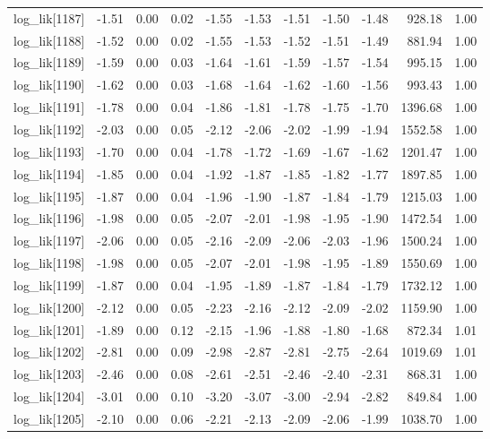 \begin{table}[ht]
\begin{tabular}{rrrrrrrrrrr}
  log\_lik[1187] & -1.51 & 0.00 & 0.02 & -1.55 & -1.53 & -1.51 & -1.50 & -1.48 & 928.18 & 1.00 \\ 
  log\_lik[1188] & -1.52 & 0.00 & 0.02 & -1.55 & -1.53 & -1.52 & -1.51 & -1.49 & 881.94 & 1.00 \\ 
  log\_lik[1189] & -1.59 & 0.00 & 0.03 & -1.64 & -1.61 & -1.59 & -1.57 & -1.54 & 995.15 & 1.00 \\ 
  log\_lik[1190] & -1.62 & 0.00 & 0.03 & -1.68 & -1.64 & -1.62 & -1.60 & -1.56 & 993.43 & 1.00 \\ 
  log\_lik[1191] & -1.78 & 0.00 & 0.04 & -1.86 & -1.81 & -1.78 & -1.75 & -1.70 & 1396.68 & 1.00 \\ 
  log\_lik[1192] & -2.03 & 0.00 & 0.05 & -2.12 & -2.06 & -2.02 & -1.99 & -1.94 & 1552.58 & 1.00 \\ 
  log\_lik[1193] & -1.70 & 0.00 & 0.04 & -1.78 & -1.72 & -1.69 & -1.67 & -1.62 & 1201.47 & 1.00 \\ 
  log\_lik[1194] & -1.85 & 0.00 & 0.04 & -1.92 & -1.87 & -1.85 & -1.82 & -1.77 & 1897.85 & 1.00 \\ 
  log\_lik[1195] & -1.87 & 0.00 & 0.04 & -1.96 & -1.90 & -1.87 & -1.84 & -1.79 & 1215.03 & 1.00 \\ 
  log\_lik[1196] & -1.98 & 0.00 & 0.05 & -2.07 & -2.01 & -1.98 & -1.95 & -1.90 & 1472.54 & 1.00 \\ 
  log\_lik[1197] & -2.06 & 0.00 & 0.05 & -2.16 & -2.09 & -2.06 & -2.03 & -1.96 & 1500.24 & 1.00 \\ 
  log\_lik[1198] & -1.98 & 0.00 & 0.05 & -2.07 & -2.01 & -1.98 & -1.95 & -1.89 & 1550.69 & 1.00 \\ 
  log\_lik[1199] & -1.87 & 0.00 & 0.04 & -1.95 & -1.89 & -1.87 & -1.84 & -1.79 & 1732.12 & 1.00 \\ 
  log\_lik[1200] & -2.12 & 0.00 & 0.05 & -2.23 & -2.16 & -2.12 & -2.09 & -2.02 & 1159.90 & 1.00 \\ 
  log\_lik[1201] & -1.89 & 0.00 & 0.12 & -2.15 & -1.96 & -1.88 & -1.80 & -1.68 & 872.34 & 1.01 \\ 
  log\_lik[1202] & -2.81 & 0.00 & 0.09 & -2.98 & -2.87 & -2.81 & -2.75 & -2.64 & 1019.69 & 1.01 \\ 
  log\_lik[1203] & -2.46 & 0.00 & 0.08 & -2.61 & -2.51 & -2.46 & -2.40 & -2.31 & 868.31 & 1.00 \\ 
  log\_lik[1204] & -3.01 & 0.00 & 0.10 & -3.20 & -3.07 & -3.00 & -2.94 & -2.82 & 849.84 & 1.00 \\ 
  log\_lik[1205] & -2.10 & 0.00 & 0.06 & -2.21 & -2.13 & -2.09 & -2.06 & -1.99 & 1038.70 & 1.00 \\ 

\end{tabular}
\end{table}
